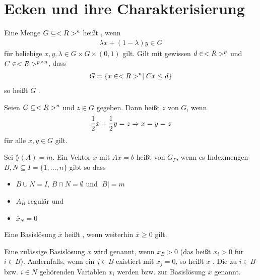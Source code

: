 \section{Ecken und ihre Charakterisierung}

\begin{definition}
	Eine Menge $G\subseteq<R>^n$ heißt , wenn
	\begin{align}
		\lambda x + (1-\lambda)y\in G
	\end{align}
	für beliebige $x,y,\lambda\in G\times G\times (0,1)$ gilt. Gilt mit gewissen $d\in<R>^p$ und $C\in<R>^{p\times n}$, dass
	\begin{align}
		G=\{x\in<R>^n\mid Cx\le d\}\notag
	\end{align}
	so heißt $G$ .
\end{definition}

\begin{definition}[Ecke]
	Seien $G\subseteq<R>^n$ und $z\in G$ gegeben. Dann heißt $z$  von $G$, wenn 
	\begin{align}
		\frac{1}{2}x + \frac{1}{2}y = z\Rightarrow x=y=z\notag
	\end{align}
	für alle $x,y\in G$ gilt.
\end{definition}

\begin{definition}[Basislösung]
	Sei $\rang(A)=m$. Ein Vektor $\overline{x}$ mit $A\overline{x}=b$ heißt  von $G_P$, wenn es Indexmengen $B,N\subseteq I=\{1,...,n\}$ gibt so dass
	\begin{itemize}
		\item $B\cup N=I$, $B\cap N=\emptyset$ und $\vert B\vert =m$
		\item $A_B$ regulär und
		\item $\overline{x}_N=0$
	\end{itemize}
	Eine Basislösung $\overline{x}$ heißt , wenn weiterhin $\overline{x}\ge 0$ gilt.
	
	Eine zulässige Basislösung $\overline{x}$ wird  genannt, wenn $\overline{x}_B>0$ (das heißt $\overline{x}_i>0$ für $i\in B$). Andernfalls, wenn ein $j\in B$ existiert mit $\overline{x}_j=0$, so heißt $\overline{x}$ . Die zu $i\in B$ bzw. $i\in N$ gehörenden Variablen $x_i$ werden  bzw.  zur Basislösung $\overline{x}$ genannt.
\end{definition}

